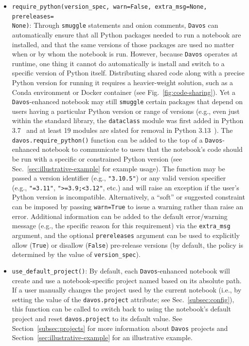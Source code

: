 \documentclass[preprint,12pt,a4paper]{elsarticle}
\begin{document}
\begin{itemize}
\item \texttt{require\_python(version\_spec, warn=False, extra\_msg=None, pre\-re\-leases=\\None)}: Through \texttt{smuggle} statements and onion comments, \texttt{Davos} can automatically ensure that all Python packages needed to run a notebook are installed, and that the same versions of those packages are used no matter when or by whom the notebook is run.
  However, because \texttt{Davos} operates at runtime, one thing it cannot do automatically is install and switch to a specific version of Python itself.
  Distributing shared code along with a precise Python version for running it requires a heavier-weight solution, such as a Conda environment or Docker container (see Fig.~\ref{fig:code-sharing}).
  Yet a \texttt{Davos}-enhanced notebook may still \texttt{smuggle} certain packages that depend on users having a particular Python version or range of versions (e.g., even just within the standard library, the \texttt{dataclass} module was first added in Python 3.7~\cite{Smit17} and at least 19 modules are slated for removal in Python 3.13~\cite{HeimCann19}).
  The \texttt{davos.require\_python()} function can be added to the top of a \texttt{Davos}-enhanced notebook to communicate to users that the notebook's code should be run with a specific or constrained Python version (see Sec.~\ref{sec:illustrative-example} for example usage).
  The function may be passed a version identifier (e.g., \texttt{"3.10.5"}) or any valid version specifier~\cite{CoghStuf13} (e.g., \texttt{"\raisebox{0.5ex}{\texttildelow}=3.11"}, \texttt{">=3.9;<3.12"}, etc.) and will raise an exception if the user's Python version is incompatible.
  Alternatively, a ``soft'' or suggested constraint can be imposed by passing \texttt{warn=True} to issue a warning rather than raise an error.
  Additional information can be added to the default error/warning message (e.g., the specific reason for this requirement) via the \texttt{extra\_msg} argument, and the optional \texttt{prereleases} argument can be used to explicitly allow (\texttt{True}) or disallow (\texttt{False}) pre-release versions (by default, the policy is determined by the value of \texttt{version\_spec}).

\item \texttt{use\_default\_project()}: By default, each \texttt{Davos}-enhanced notebook will create and use a notebook-specific project named based on its absolute path.
  If a user manually changes the project used by the current notebook (i.e., by setting the value of the \texttt{davos.project} attribute; see Sec.~\ref{subsec:config}), this function can be called to switch back to using the notebook's default project and reset \texttt{davos.project} to its default value.
  See Section~\ref{subsec:projects} for more information about \texttt{Davos} projects and Section~\ref{sec:illustrative-example} for an illustrative example.

\end{itemize}
\end{document}
